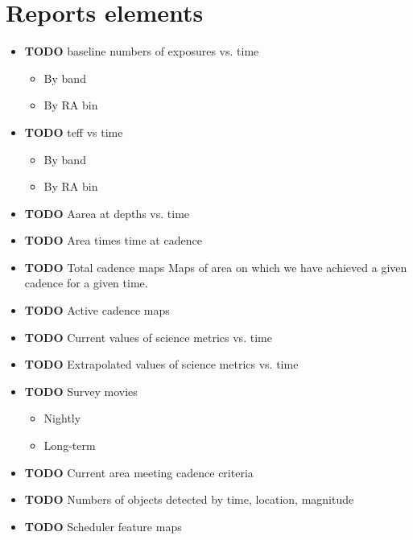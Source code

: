 \section{Reports elements}
\label{sec:orgbb2408d}
\begin{itemize}
\item {\bfseries\sffamily TODO} baseline numbers of exposures vs. time
\label{sec:org1ab4bcf}
\begin{itemize}
\item By band
\label{sec:org940f7a2}
\item By RA bin
\label{sec:org147c5bd}
\end{itemize}
\item {\bfseries\sffamily TODO} teff vs time
\label{sec:org6d0693c}
\begin{itemize}
\item By band
\label{sec:org7e4cc06}
\item By RA bin
\label{sec:org74504d3}
\end{itemize}
\item {\bfseries\sffamily TODO} Aarea at depths vs. time
\label{sec:org25ed627}
\item {\bfseries\sffamily TODO} Area times time at cadence
\label{sec:org2eafea4}
\item {\bfseries\sffamily TODO} Total cadence maps
\label{sec:orgf9cc8c9}
Maps of area on which we have achieved a given cadence for a given time.
\item {\bfseries\sffamily TODO} Active cadence maps
\label{sec:org5402458}
\item {\bfseries\sffamily TODO} Current values of science metrics vs. time
\label{sec:org1d919b5}
\item {\bfseries\sffamily TODO} Extrapolated values of science metrics vs. time
\label{sec:orgb39e94f}
\item {\bfseries\sffamily TODO} Survey movies
\label{sec:org94e487d}
\begin{itemize}
\item Nightly
\label{sec:orgc855c47}
\item Long-term
\label{sec:orge8a98ba}
\end{itemize}
\item {\bfseries\sffamily TODO} Current area meeting cadence criteria
\label{sec:org2bae485}
\item {\bfseries\sffamily TODO} Numbers of objects detected by time, location, magnitude
\label{sec:org86bb3b0}
\item {\bfseries\sffamily TODO} Scheduler feature maps

\end{itemize}
